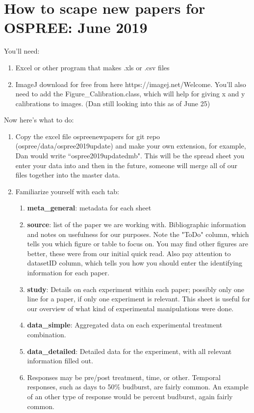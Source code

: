 \documentclass{article}\usepackage[]{graphicx}\usepackage[]{color}
\begin{document}
\section*{How to scape new papers for OSPREE: June 2019}
You'll need:
\begin{enumerate}
\item Excel or other program that makes .xls  or .csv files
\item ImageJ download for free from here https://imagej.net/Welcome. You'll also need to add the Figure_Calibration.class, which will help for giving x and y calibrations to images. (Dan still looking into this as of June 25)
\end{enumerate}

Now here's what to do:
\begin{enumerate}
\item Copy the excel file ospree\textunderscore newpapers for git repo (ospree/data/ospree\textunderscore 2019update) and make your own extension, for example, Dan would write ``ospree\textunderscore 2019update\textunderscore dmb". This will be the spread sheet you enter your data into and then in the future, someone will merge all of our files together into the master data.
\item Familiarize yourself with each tab:
  \begin{enumerate}
  \item \textbf{meta\_general}: metadata for each sheet
  \item \textbf{source}: list of the paper we are working with. Bibliographic information and notes on usefulness for our purposes. Note the "ToDo" column, which tells you which figure or table to focus on. You may find other figures are better, these were from our initial quick read. Also pay attention to datasetID column, which tells you how you should enter the identifying information for each paper.
  \item \textbf{study}: Details on each experiment within each paper; possibly only one line for a paper, if only one experiment is relevant. This sheet is useful for our overview of what kind of experimental manipulations were done.
  \item \textbf{data\_simple}: Aggregated data on each experimental treatment combination.
  \item \textbf{data\_detailed}: Detailed data for the experiment, with all relevant information filled out.
  \item Responses may be pre/post treatment, time, or other. Temporal responses, such as days to 50\% budburst, are fairly common. An example of an other type of response would be percent budburst, again fairly common.

\end{enumerate}
\end{enumerate}
\end{document}
